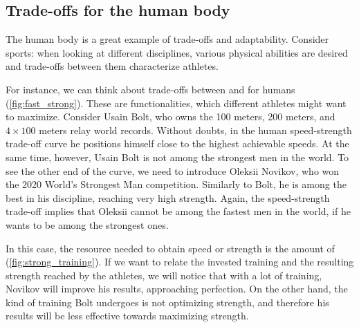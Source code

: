 \ifextraspace{\vfill\clearpage}

\subsection{Trade-offs for the human body}

\begin{marginfigure}
    \centering
    \caption{}
    \label{fig:fast_strong}
\end{marginfigure}

The human body is a great example of trade-offs and adaptability.
Consider sports: when looking at different disciplines, various physical abilities are desired and trade-offs between them characterize athletes.

For instance, we can think about trade-offs between  and  for humans (\cref{fig:fast_strong}).
These are functionalities, which different athletes might want to maximize.
Consider Usain Bolt, who owns the 100 meters, 200 meters, and~$4\times 100$ meters relay world records.
Without doubts, in the human speed-strength trade-off curve he positions himself close to the highest achievable speeds.
At the same time, however, Usain Bolt is not among the strongest men in the world.
To see the other end of the curve, we need to introduce Oleksii Novikov, who won the 2020 World's Strongest Man competition.
Similarly to Bolt, he is among the best in his discipline, reaching very high strength.
Again, the speed-strength trade-off implies that Oleksii cannot be among the fastest men in the world, if he wants to be among the strongest ones.

\begin{marginfigure}
    \centering
    \caption{}
    \label{fig:strong_training}
\end{marginfigure}

In this case, the resource needed to obtain speed or strength is the amount of  (\cref{fig:strong_training}).
If we want to relate the invested training and the resulting strength reached by the athletes, we will notice that with a lot of training, Novikov will improve his results, approaching perfection.
On the other hand, the kind of training Bolt undergoes is not optimizing strength, and therefore his results will be less effective towards maximizing strength.

